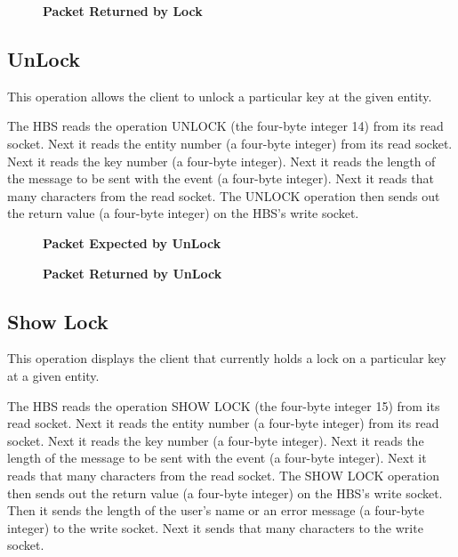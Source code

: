 \begin{figure}[htb]
  \centerline{}
  \caption{{\bf Packet Returned by Lock}}
  \label{fig:Lock2}
\end{figure}

\newpage
\subsection{UnLock}

This operation allows the client to unlock a particular key at the given
entity.  

The HBS reads the operation UNLOCK (the four-byte integer 14) from its read
socket.  Next it reads the entity number (a four-byte integer) from its
read socket.  Next it reads the key number (a four-byte integer).  Next it
reads the length of the message to be sent with the event (a 
four-byte integer).  Next it reads that many characters from the read
socket.  The UNLOCK operation then sends out the return value (a
four-byte integer) on the HBS's write socket.

\begin{figure}[htb]
  \centerline{}
  \caption{{\bf Packet Expected by UnLock}}
  \label{fig:UnLock1}
\end{figure}

\begin{figure}[htb]
  \centerline{}
  \caption{{\bf Packet Returned by UnLock}}
  \label{fig:UnLock2}
\end{figure}


\newpage
\subsection{Show Lock}

This operation displays the client that currently holds a lock on a
particular key at a given entity.  

The HBS reads the operation SHOW LOCK (the four-byte integer 15) from its
read socket.  Next it reads the entity number (a four-byte integer) from
its read socket.  Next it reads the key number (a four-byte integer).  Next
it reads the length of the message to be sent with the event (a four-byte
integer).  Next it reads that many characters from the read socket.  The
SHOW LOCK operation then sends out the return value (a four-byte integer)
on the HBS's write socket.  Then it sends the length of the user's name or
an error message (a four-byte integer) to the write socket.  Next it sends
that many characters to the write socket.

